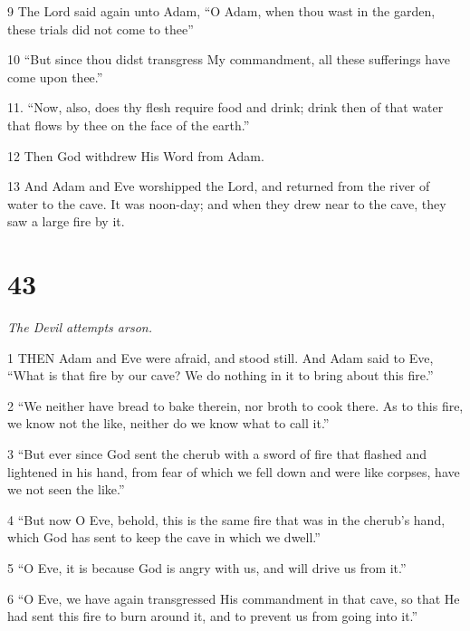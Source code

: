 \par 9 The Lord said again unto Adam, “O Adam, when thou wast in the garden, these trials did not come to thee”

\par 10 “But since thou didst transgress My commandment, all these sufferings have come upon thee.”

\par 11. “Now, also, does thy flesh require food and drink; drink then of that water that flows by thee on the face of the earth.”

\par 12 Then God withdrew His Word from Adam.

\par 13 And Adam and Eve worshipped the Lord, and returned from the river of water to the cave. It was noon-day; and when they drew near to the cave, they saw a large fire by it.

\chapter{43}

\par \textit{The Devil attempts arson.}

\par 1 THEN Adam and Eve were afraid, and stood still. And Adam said to Eve, “What is that fire by our cave? We do nothing in it to bring about this fire.”

\par 2 “We neither have bread to bake therein, nor broth to cook there. As to this fire, we know not the like, neither do we know what to call it.”

\par 3 “But ever since God sent the cherub with a sword of fire that flashed and lightened in his hand, from fear of which we fell down and were like corpses, have we not seen the like.”

\par 4 “But now O Eve, behold, this is the same fire that was in the cherub's hand, which God has sent to keep the cave in which we dwell.”

\par 5 “O Eve, it is because God is angry with us, and will drive us from it.”

\par 6 “O Eve, we have again transgressed His commandment in that cave, so that He had sent this fire to burn around it, and to prevent us from going into it.”

